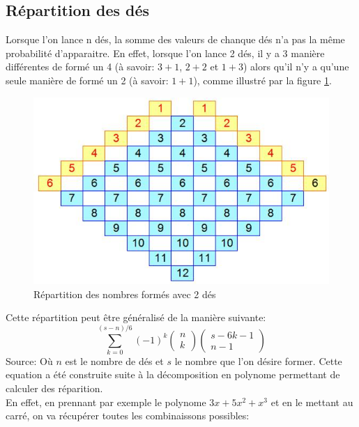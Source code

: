 \documentclass[letterpaper]{article}
\begin{document}
  \subsection{Répartition des dés}
    \label{repart_des}
    Lorsque l'on lance n dés, la somme des valeurs de chanque dés n'a pas la même probabilité
    d'apparaitre.  En effet, lorsque l'on lance 2 dés, il y a 3 manière différentes de formé
    un 4 (à savoir: $3+1$, $2+2$ et $1+3$) alors qu'il n'y a qu'une seule manière de formé un 
    2 (à savoir: $1+1$), comme illustré par la figure \ref{tableau_repartition_des}.
    \begin{figure}[h]
      \centering
      \includegraphics[scale=0.4]{./Images/RepartitionDes.jpg}
	\caption{Répartition des nombres formés avec 2 dés \citep{IMG_Des}}
      \label{tableau_repartition_des}
    \end{figure}
    Cette répartition peut être généralisé de la manière suivante:
    $$\sum\limits_{k=0}^{(s-n)/6} (-1)^k \begin{pmatrix}n \\ k\end{pmatrix} 
      \begin{pmatrix}s-6k-1 \\n-1\end{pmatrix}$$
    Source: %
    Où $n$ est le nombre de dés et $s$ le nombre que l'on désire former.  Cette equation
    a été construite suite à la décomposition en polynome permettant de calculer des
    réparition.\\
    En effet, en prennant par exemple le polynome $3x + 5x^2 + x^3$ et en le mettant au 
    carré, on va récupérer toutes les combinaissons possibles:
\end{document}
